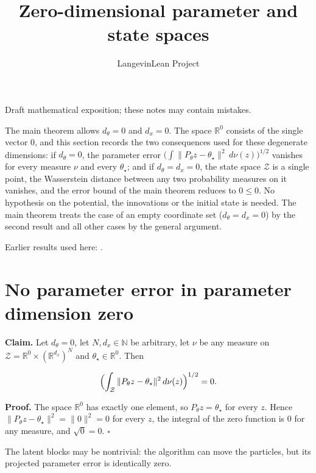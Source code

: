 \documentclass[11pt,a4paper]{article}
\title{\texorpdfstring{Zero-dimensional parameter and state spaces}{Zero-dimensional parameter and state spaces}}
\author{LangevinLean Project}
\date{}
\begin{document}
\maketitle
Draft mathematical exposition; these notes may contain mistakes.


The main theorem allows \(d_\theta=0\) and \(d_x=0\). The space \(\mathbb R^0\) consists of the single vector \(0\), and this section records the two consequences used for these degenerate dimensions: if \(d_\theta=0\), the parameter error \(\bigl(\int\|P_\theta z-\theta_\star\|^2\,d\nu(z)\bigr)^{1/2}\) vanishes for every measure \(\nu\) and every \(\theta_\star\); and if \(d_\theta=d_x=0\), the state space \(\mathcal Z\) is a single point, the Wasserstein distance between any two probability measures on it vanishes, and the error bound of the main theorem reduces to \(0\le0\). No hypothesis on the potential, the innovations or the initial state is needed. The main theorem treats the case of an empty coordinate set (\(d_\theta=d_x=0\)) by the second result and all other cases by the general argument.



Earlier results used here: \cite[Section~3.51]{LangevinLean2026ULASC}.

\section{\texorpdfstring{No parameter error in parameter dimension zero}{No parameter error in parameter dimension zero}}


\textbf{Claim.} Let \(d_\theta=0\), let \(N,d_x\in\mathbb N\) be arbitrary, let \(\nu\) be any measure on \(\mathcal Z=\mathbb R^0\times(\mathbb R^{d_x})^N\) and \(\theta_\star\in\mathbb R^0\). Then


\[\Bigl(\int_{\mathcal Z}\|P_\theta z-\theta_\star\|^2\,d\nu(z)\Bigr)^{1/2}=0 .\]


\textbf{Proof.} The space \(\mathbb R^0\) has exactly one element, so \(P_\theta z=\theta_\star\) for every \(z\). Hence \(\|P_\theta z-\theta_\star\|^2=\|0\|^2=0\) for every \(z\), the integral of the zero function is \(0\) for any measure, and \(\sqrt0=0\). \(\square\)




The latent blocks may be nontrivial: the algorithm can move the particles, but its projected parameter error is identically zero.
\end{document}
